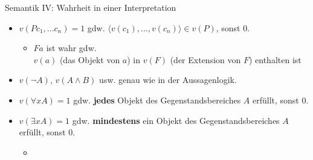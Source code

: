 \documentclass[12pt]{beamer}
\begin{document}
\begin{frame}{Semantik IV: Wahrheit in einer Interpretation}
  \begin{itemize}[<+->]
  \item $v(Pc_1,...c_n) = 1$ gdw.
    $\langle v(c_1),...,v(c_n)\rangle \in v(P)$, sonst 0.
    \begin{itemize}
    \item $Fa$ ist wahr gdw.\\ $v(a)$ (das Objekt von $a$) in $v(F)$
      (der Extension von $F$) enthalten ist
    \end{itemize}
  \item $v(\neg A)$, $v(A \land B)$ usw. genau wie in der
    Aussagenlogik.
  \end{itemize}

  \begin{itemize}[<+->]
    
\item $v(\forall xA) = 1$ gdw. \textbf{jedes} Objekt des Gegenstandsbereiches $A$ erfüllt, sonst 0.
\item $v(\exists xA) = 1$ gdw. \textbf{mindestens} ein Objekt des Gegenstandsbereiches $A$ erfüllt, sonst 0.
  \begin{itemize}
  \item 
  \end{itemize}

  \end{itemize}

\end{frame}

\end{document}
